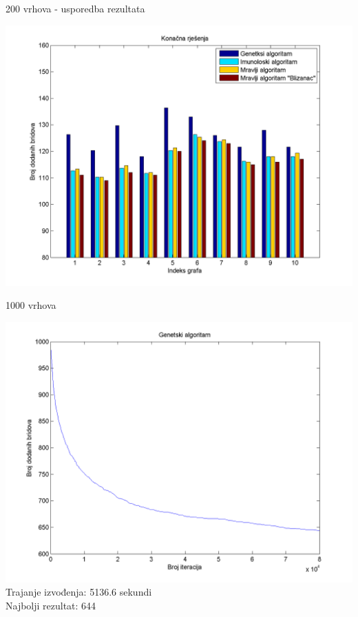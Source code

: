 \documentclass{beamer}
\begin{document}
\begin{frame}{200 vrhova - usporedba rezultata}
\begin{center}
\includegraphics[scale = 0.45]{zadnjih10.png}\\
\end{center}
\end{frame}

\begin{frame}{1000 vrhova}
\begin{center}
\includegraphics[scale = 0.4]{Gen1000.png}\\
Trajanje izvođenja: 5136.6 sekundi\\
Najbolji rezultat: 644\\
\end{center}
\end{frame}
\end{document}
